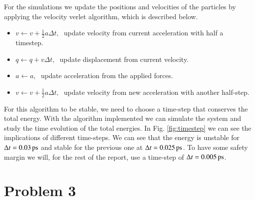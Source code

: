 For the simulations we update the positions and velocities of the particles by applying the velocity verlet algorithm, which is described below.

\begin{itemize}
\item $v \leftarrow v +\frac{1}{2}a\Delta t, \;$ update velocity from current acceleration with half a timestep.
\item $q \leftarrow q +v\Delta t, \;$ update displacement from current velocity.
\item $a \leftarrow a, \;$ update acceleration from the applied forces.
\item $v \leftarrow v +\frac{1}{2}a\Delta t, \;$ update velocity from new acceleration with another half-step.
\end{itemize}

For this algorithm to be stable, we need to choose a time-step that conserves the total energy. With the algorithm implemented we can simulate the system and study the time evolution of the total energies. In Fig. \ref{fig:timestep} we can see the implications of different time-steps. We can see that the energy is unstable for $\Delta t = \unit[0.03]{ps}$ and stable for the previous one at $\Delta t = \unit[0.025]{ps}$. To have some safety margin we will, for the rest of the report, use a time-step of $\Delta t = \unit[0.005]{ps}$.

\section*{Problem 3}

